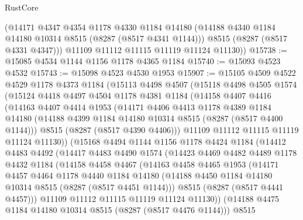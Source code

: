 \begin{lexlean}{RustCore}
\begin{coremodule}
        (@14171
          @4347
          @4354
          @1178
          @4330
          @1184
          @14180
          (@14188 @4340 @1184 @14180 @10314 @8515 (@8287 (@8517 @4341 @1144)))
          @8515
          (@8287 (@8517 @4331 @4347)))
        @11109
        @11112
        @11115
        @11119
        @11124
        @11130))
@15738 := @15085 @4534 @1144 @1156 @1178 @4365 @1184
@15740 := @15093 @4523 @4532
@15743 := @15098 @4523 @4530 @1953
@15907 := @15105
    @4509
    @4522
    @4529
    @1178
    @4373
    @1184
    (@15113
      @4498
      @4507
      (@15118
        @4498
        @4505
        @1574
        (@15124
          @4418
          @4497
          @4504
          @1178
          @4381
          @1184
          (@14158
            @4407
            @4416
            (@14163
              @4407
              @4414
              @1953
              (@14171
                @4406
                @4413
                @1178
                @4389
                @1184
                @14180
                (@14188 @4399 @1184 @14180 @10314 @8515 (@8287 (@8517 @4400 @1144)))
                @8515
                (@8287 (@8517 @4390 @4406)))
              @11109
              @11112
              @11115
              @11119
              @11124
              @11130))
          (@15168
            @4494
            @1144
            @1156
            @1178
            @4424
            @1184
            (@14412
              @4483
              @4492
              (@14417
                @4483
                @4490
                @1574
                (@14423
                  @4469
                  @4482
                  @4489
                  @1178
                  @4432
                  @1184
                  (@14158
                    @4458
                    @4467
                    (@14163
                      @4458
                      @4465
                      @1953
                      (@14171
                        @4457
                        @4464
                        @1178
                        @4440
                        @1184
                        @14180
                        (@14188 @4450 @1184 @14180 @10314 @8515 (@8287 (@8517 @4451 @1144)))
                        @8515
                        (@8287 (@8517 @4441 @4457)))
                      @11109
                      @11112
                      @11115
                      @11119
                      @11124
                      @11130))
                  (@14188 @4475 @1184 @14180 @10314 @8515 (@8287 (@8517 @4476 @1144)))
                  @8515

\end{coremodule}
\end{lexlean}
